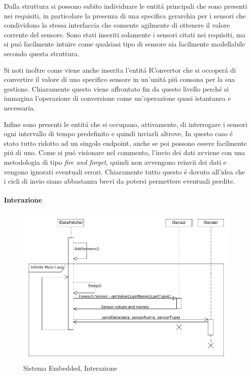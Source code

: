 Dalla struttura si possono subito individuare le entit\'a principali che sono presenti nei requisiti, in particolare la presenza di una specifica gerarchia per i sensori che condividono la stessa interfaccia che consente agilmente di ottenere il valore corrente del sensore. Sono stati inseriti solamente i sensori citati nei requisiti, ma si pu\'o facilmente intuire come qualsiasi tipo di sensore sia facilmente modellabile secondo questa struttura.

Si noti inoltre come viene anche inserita l'entit\'a IConvertor che si occoper\'a di convertire il valore di uno specifico sensore in un'unit\'a pi\'u consona per la sua gestione. Chiaramente questo viene affrontato fin da questo livello perch\'e si immagina l'operazione di conversione come un'operazione quasi istantanea e necessaria.

Infine sono presenti le entit\'a che si occupano, attivamente, di interrogare i sensori ogni intervallo di tempo predefinito e quindi inviarli altrove, In questo caso \'e stato tutto ridotto ad un singolo endpoint, anche se poi possono essere facilmente pi\'u di uno. Come si pu\'o visionare nel commento, l'invio dei dati avviene con una metodologia di tipo \textit{fire and forget}, quindi non avvengono reinvii dei dati e vengono ignorati eventuali errori. Chiaramente tutto questo \'e dovuto all'idea che i cicli di invio siano abbastanza brevi da potersi permettere eventuali perdite.

\paragraph{Interazione}

\begin{figure}[H]
\centering
\includegraphics[width=\textwidth]{Figures/DomainModel/EmbeddedSystem/Interaction.jpg}
\caption{Sistema Embedded, Interazione}
\end{figure}

